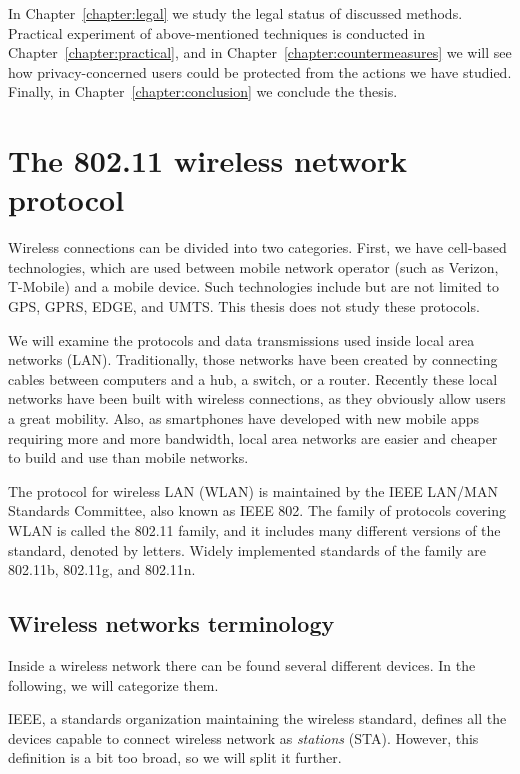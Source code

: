 \documentclass[12pt,a4paper,oneside,pdftex]{report}
\begin{document}
In Chapter~\ref{chapter:legal} we study the legal status of discussed methods. Practical experiment of above-mentioned techniques is conducted in Chapter~\ref{chapter:practical}, and in Chapter~\ref{chapter:countermeasures} we will see how privacy-concerned users could be protected from the actions we have studied. Finally, in Chapter~\ref{chapter:conclusion} we conclude the thesis.




\chapter{The 802.11 wireless network protocol}
\label{chapter:protocol}


Wireless connections can be divided into two categories. First, we have cell-based technologies, which are used between mobile network operator (such as Verizon, T-Mobile) and a mobile device. Such technologies include but are not limited to GPS, GPRS, EDGE, and UMTS. This thesis does not study these protocols.

We will examine the protocols and data transmissions used inside local area networks (LAN). Traditionally, those networks have been created by connecting cables between computers and a hub, a switch, or a router. Recently these local networks have been built with wireless connections, as they obviously allow users a great mobility. Also, as smartphones have developed with new mobile apps requiring more and more bandwidth, local area networks are easier and cheaper to build and use than mobile networks.

The protocol for wireless LAN (WLAN) is maintained by the IEEE LAN/MAN Standards Committee, also known as IEEE 802. The family of protocols covering WLAN is called the 802.11 family, and it includes many different versions of the standard, denoted by letters. Widely implemented standards of the family are 802.11b, 802.11g, and 802.11n.~\cite{IEEE802.11}


\section{Wireless networks terminology}
\label{sec:terminology}

Inside a wireless network there can be found several different devices. In the following, we will categorize them.

IEEE, a standards organization maintaining the wireless standard, defines all the devices capable to connect wireless network as \emph{stations} (STA). However, this definition is a bit too broad, so we will split it further.
\end{document}
